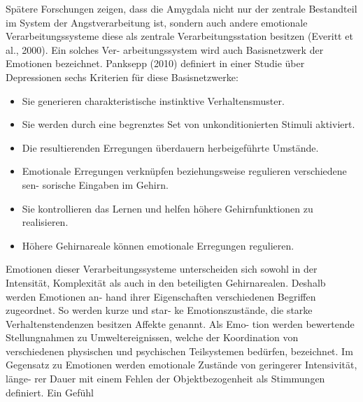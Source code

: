 
Spätere Forschungen zeigen, dass die Amygdala nicht nur der zentrale Bestandteil im
System der Angstverarbeitung ist, sondern auch andere emotionale Verarbeitungssysteme
diese als zentrale Verarbeitungsstation besitzen (Everitt et al., 2000). Ein solches Ver-
arbeitungssystem wird auch Basisnetzwerk der Emotionen bezeichnet. Panksepp (2010)
definiert in einer Studie über Depressionen sechs Kriterien für diese Basisnetzwerke:
\begin{itemize}
\item Sie generieren charakteristische instinktive Verhaltensmuster.
\item Sie werden durch eine begrenztes Set von unkonditionierten Stimuli aktiviert.
\item Die resultierenden Erregungen überdauern herbeigeführte Umstände.
\item Emotionale Erregungen verknüpfen beziehungsweise regulieren verschiedene sen-
sorische Eingaben im Gehirn.
\item Sie kontrollieren das Lernen und helfen höhere Gehirnfunktionen zu realisieren.
\item Höhere Gehirnareale können emotionale Erregungen regulieren.
\end{itemize}

Emotionen dieser Verarbeitungssysteme unterscheiden sich sowohl in der Intensität,
Komplexität als auch in den beteiligten Gehirnarealen. Deshalb werden Emotionen an-
hand ihrer Eigenschaften verschiedenen Begriffen zugeordnet. So werden kurze und star-
ke Emotionszustände, die starke Verhaltenstendenzen besitzen Affekte genannt. Als Emo-
tion werden bewertende Stellungnahmen zu Umweltereignissen, welche der Koordination
von verschiedenen physischen und psychischen Teilsystemen bedürfen, bezeichnet. Im
Gegensatz zu Emotionen werden emotionale Zustände von geringerer Intensivität, länge-
rer Dauer mit einem Fehlen der Objektbezogenheit als Stimmungen definiert. Ein Gefühl


